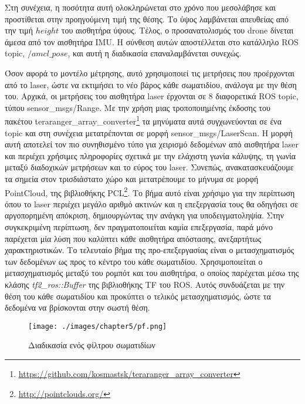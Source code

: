Στη συνέχεια, η ποσότητα αυτή ολοκληρώνεται στο χρόνο που μεσολάβησε και προστίθεται στην προηγούμενη τιμή της θέσης. Το ύψος λαμβάνεται απευθείας από την τιμή $height$ του αισθητήρα ύψους. Τέλος, ο προσανατολισμός του drone δίνεται άμεσα από τον αισθητήρα IMU. Η σύνθεση αυτών αποστέλλεται στο κατάλληλο ROS topic, $/amcl\_pose$, και αυτή η διαδικασία επαναλαμβάνεται συνεχώς.

Όσον αφορά το μοντέλο μέτρησης, αυτό χρησιμοποιεί τις μετρήσεις που προέρχονται από το laser, ώστε να εκτιμήσει το νέο βάρος κάθε σωματιδίου, ανάλογα με την θέση του. Αρχικά, οι μετρήσεις του αισθητήρα laser έρχονται σε 8 διαφορετικά ROS topic, τύπου sensor\_msgs/Range. Με την χρήση μιας τροποποιημένης έκδοσης του πακέτου teraranger\_array\_converter\footnote{\href{https://github.com/kosmastsk/teraranger\_array\_converter}{https://github.com/kosmastsk/teraranger\_array\_converter}} τα μηνύματα αυτά συγχωνεύονται σε ένα topic και στη συνέχεια μετατρέπονται σε μορφή sensor\_msgs/LaserScan. Η μορφή αυτή αποτελεί τον πιο συνηθισμένο τύπο για χειρισμό δεδομένων από αισθητήρα laser και περιέχει χρήσιμες πληροφορίες σχετικά με την ελάχιστη γωνία κάλυψης, τη γωνία μεταξύ διαδοχικών μετρήσεων και το εύρος του laser. Συνεπώς, ανακατασκευάζουμε τα σημεία στον τρισδιάστατο χώρο και μετατρέπουμε το μήνυμα σε μορφή PointCloud, της βιβλιοθήκης PCL\footnote{\href{http://pointclouds.org/}{http://pointclouds.org/}}. Το βήμα αυτό είναι χρήσιμο για την περίπτωση όπου το laser περιέχει μεγάλο αριθμό ακτινών και η επεξεργασία τους θα οδηγήσει σε αργοπορημένη απόκριση, δημιουργώντας την ανάγκη για υποδειγματοληψία. Στην συγκεκριμένη περίπτωση, δεν πραγματοποιείται καμία επεξεργασία, παρά μόνο παρέχεται μία λύση που καλύπτει κάθε αισθητήρα απόστασης, ανεξαρτήτως χαρακτηριστικών. Το τελευταίο βήμα της προ-επεξεργασίας είναι ο μετασχηματισμός των δεδομένων ως προς το κέντρο του κάθε σωματιδίου. Χρησιμοποιείται ο μετασχηματισμός μεταξύ του ρομπότ και του αισθητήρα, ο οποίος παρέχεται μέσω της κλάσης \emph{tf2\_ros::Buffer} της βιβλιοθήκης TF του ROS. Αυτός συνδυάζεται με την θέση του κάθε σωματιδίου και προκύπτει ο τελικός μετασχηματισμός, ώστε τα δεδομένα να βρίσκονται στην σωστή θέση.

\begin{figure}[!ht]
    \centering
    \texttt{[image: ./images/chapter5/pf.png]}
        \caption{Διαδικασία ενός φίλτρου σωματιδίων} 
    \label{fig:pf}
\end{figure}

